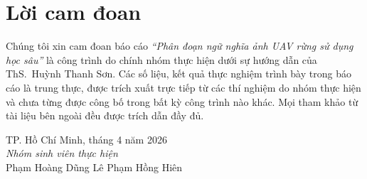\chapter*{Lời cam đoan}

Chúng tôi xin cam đoan báo cáo \textit{``Phân đoạn ngữ nghĩa ảnh UAV rừng sử dụng học
sâu''} là công trình do chính nhóm thực hiện dưới sự hướng dẫn của
ThS.~Huỳnh Thanh Sơn. Các số liệu, kết quả thực nghiệm trình bày trong báo cáo là
trung thực, được trích xuất trực tiếp từ các thí nghiệm do nhóm thực hiện và chưa
từng được công bố trong bất kỳ công trình nào khác. Mọi tham khảo từ tài liệu bên
ngoài đều được trích dẫn đầy đủ.

\vspace{1.5cm}
\begin{flushright}
TP. Hồ Chí Minh, tháng 4 năm 2026\\[0.3cm]
\textit{Nhóm sinh viên thực hiện}\\[1.5cm]
Phạm Hoàng Dũng \qquad\qquad Lê Phạm Hồng Hiên
\end{flushright}
